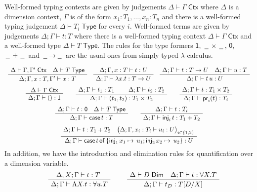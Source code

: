 \documentclass[a4paper,UKenglish]{lipics}
\theoremstyle{plain}
\newcommand{\ra}{\rightarrow}
\newcommand{\msf}[1]{\mathsf{#1}} %
\newcommand{\blank}{\, \underline{\hspace{2mm}} \,}
\newcommand{\unitTy}{\msf{1}}
\newcommand{\emptyTy}{\msf{0}}
\newcommand{\cj}[2]{#1 \vdash #2 \; \msf{ Ctx}}
\newcommand{\Tj}[2]{#1 \vdash #2 \; \msf{ Type}}
\newcommand{\Dj}[2]{#1 \vdash #2 \; \msf{ Dim}}
\newcommand{\tj}[4]{#1;#2 \vdash #3 : #4}
\newcommand{\proj}{\mathsf{pr}}
\newcommand{\inj}{\mathsf{inj}}
\newcommand{\emptyelim}{\mathsf{case}\,}
\newcommand{\case}[5]{\mathsf{case}\,#1\,\mathsf{of}\,\{\inj_1\,#2 \mapsto\,#3; \inj_2\,#4\mapsto\,#5\}}
\newcommand{\Dim}{D}
\newcommand{\Dvar}{X}
\begin{document}
\vspace{3mm}  Well-formed typing contexts are given by judgements
$\cj\Delta\Gamma $ where $\Delta$ is a dimension context, $\Gamma$ is
of the form ${x_1 : T_1, \ldots, x_n:T_n}$ and there is a well-formed
typing judgement $\Tj\Delta{ T_i}$ for every $i$. Well-formed terms
are given by judgements $\tj \Delta \Gamma t T$ where there is a
well-formed typing context $\cj \Delta \Gamma$ and
a well-formed type $\Tj \Delta T $. The rules for
the type formers $\unitTy$, $\blank\times\blank$, $\emptyTy$, $\blank+\blank$ and $\blank \! \ra \! \blank$ are the usual ones from
simply typed $\lambda$-calculus.

\[\begin{array}{c}%
\AxiomC{%
$\cj \Delta{\Gamma,\Gamma'}\quad
\Tj\Delta T$}
\UnaryInfC
{$\tj \Delta{\Gamma,x:T,\Gamma'}xT$}
\DisplayProof
\quad
\AxiomC{%
$
\tj\Delta {\Gamma,x:T} {t}{U}
$%
}
\UnaryInfC
{$\tj\Delta {\Gamma} {\lambda x.t}{T\to U}$}
\DisplayProof
\quad
\AxiomC{%
$
\tj\Delta {\Gamma} {t}{T\to U}\quad
\tj\Delta {\Gamma} {u}{T}
$%
}
\UnaryInfC
{$\tj \Delta{\Gamma}{t\,u}U$}
\DisplayProof
\\[5mm]
\AxiomC{%
$\cj\Delta {\Gamma}
$%
}
\UnaryInfC
{$\tj \Delta{\Gamma}{()}\unitTy$}
\DisplayProof
\qquad
\AxiomC{$\tj\Delta {\Gamma} {t_1}{T_1}$}
\AxiomC{$\tj\Delta {\Gamma} {t_2}{T_2}$}
\BinaryInfC
{$\tj \Delta{\Gamma}{(t_1,t_2)}{T_1\times T_2}$}
\DisplayProof
\qquad
\AxiomC{%
$
\tj\Delta {\Gamma} {t}{T_1\times T_2}
$%
}
\UnaryInfC
{$\tj\Delta {\Gamma} {\proj_i(t)}{T_i}$}
\DisplayProof
\\[5mm]
\AxiomC{%
$
\tj\Delta {\Gamma} {t}{\emptyTy}
\quad \Tj\Delta T$%
}
\UnaryInfC
{$\tj\Delta {\Gamma} {\emptyelim t}{T}$}
\DisplayProof
\qquad
\AxiomC{%
$
\tj\Delta {\Gamma} {t}{T_i}$}
\UnaryInfC
{$\tj\Delta {\Gamma} {\inj_i\,t}{T_1 + T_2}$}
\DisplayProof
\\[5mm]
\AxiomC{$\tj\Delta {\Gamma} {t}{T_1 + T_2}
\quad \big(\tj\Delta {\Gamma, x_i : T_i} {u_i}{U}\big)_{i\in\{1,2\}}$}
\UnaryInfC
{$\tj\Delta {\Gamma} {\case{t}{x_1}{u_1}{x_2}{u_2}}{U}$}
\DisplayProof
\end{array}\]
%
In addition, we have the introduction and elimination rules for quantification over a dimension variable.
\[\begin{array}{cc}
\hspace{5mm}
\AxiomC{$\tj{\Delta,\Dvar}\Gamma tT$ }
		\UnaryInfC{$\tj \Delta  \Gamma {\Lambda \Dvar.t} {\forall u.T}$}
		\DisplayProof

&\hspace{5mm}
\AxiomC{$\Dj\Delta \Dim \quad \tj \Delta \Gamma  t{\forall \Dvar.T}$}
	\UnaryInfC{$\tj \Delta  \Gamma {t_\Dim}{T[\Dim/\Dvar]}$}
	\DisplayProof
\end{array}\]
\end{document}
